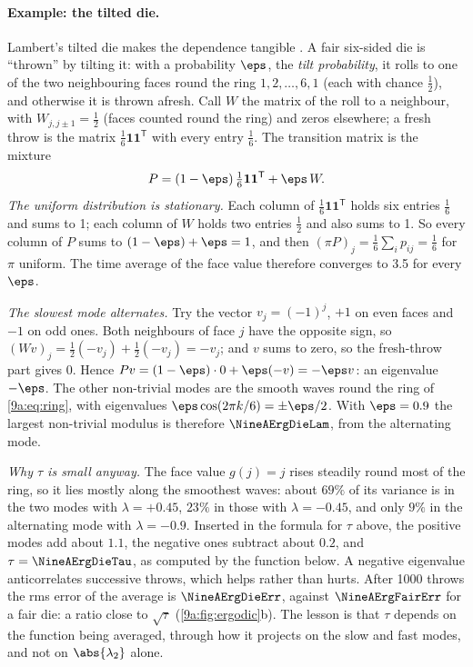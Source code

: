 \paragraph{Example: the tilted die.}
Lambert's tilted die makes the dependence tangible . A fair six-sided die
is ``thrown'' by tilting it: with a probability $\eps$, the \emph{tilt probability}, it rolls to
one of the two neighbouring faces round the ring $1,2,\dots,6,1$ (each with chance $\tfrac12$),
and otherwise it is thrown afresh. Call $W$ the matrix of the roll to a neighbour, with
$W_{j,j\pm1}=\tfrac12$ (faces counted round the ring) and zeros elsewhere; a fresh throw is the
matrix $\tfrac16\mathbf1\mathbf1^{\mathsf T}$ with every entry $\tfrac16$. The transition matrix
is the mixture
\begin{equation*}
  P=(1-\eps)\,\tfrac16\mathbf1\mathbf1^{\mathsf T}+\eps\,W .
\end{equation*}
\emph{The uniform distribution is stationary.} Each column of $\tfrac16\mathbf1\mathbf1^{\mathsf T}$
holds six entries $\tfrac16$ and sums to 1; each column of $W$ holds two entries $\tfrac12$ and
also sums to 1. So every column of $P$ sums to $(1-\eps)+\eps=1$, and then
$(\pi P)_j=\tfrac16\sum_ip_{ij}=\tfrac16$ for $\pi$ uniform. The time average of the face value
therefore converges to 3.5 for every $\eps$.

\emph{The slowest mode alternates.} Try the vector $v_j=(-1)^j$, $+1$ on even faces and $-1$
on odd ones. Both neighbours of face $j$ have the opposite sign, so $(Wv)_j=\tfrac12(-v_j)+\tfrac12(-v_j)=-v_j$;
and $v$ sums to zero, so the fresh-throw part gives $0$. Hence $Pv=(1-\eps)\cdot0+\eps(-v)=-\eps v$:
an eigenvalue $-\eps$. The other non-trivial modes are the smooth waves round the ring of
\eqref{9a:eq:ring}, with eigenvalues $\eps\cos(2\pi k/6)=\pm\eps/2$. With $\eps=0.9$ the largest
non-trivial modulus is therefore $\NineAErgDieLam$, from the alternating mode.

\emph{Why $\tau$ is small anyway.} The face value $g(j)=j$ rises steadily round most of the ring,
so it lies mostly along the smoothest waves: about $69\%$ of its variance is in the two modes
with $\lambda=+0.45$, $23\%$ in those with $\lambda=-0.45$, and only $9\%$ in the alternating
mode with $\lambda=-0.9$. Inserted in the formula for $\tau$ above, the positive modes add about
$1.1$, the negative ones subtract about $0.2$, and $\tau=\NineAErgDieTau$, as computed by the
function below. A negative eigenvalue anticorrelates successive throws, which helps rather than
hurts. After 1000 throws the rms error of the average is $\NineAErgDieErr$, against
$\NineAErgFairErr$ for a fair die: a ratio close to $\sqrt\tau$ (\cref{9a:fig:ergodic}b). The
lesson is that $\tau$ depends on the function being averaged, through how it projects on the
slow and fast modes, and not on $\abs{\lambda_2}$ alone.

